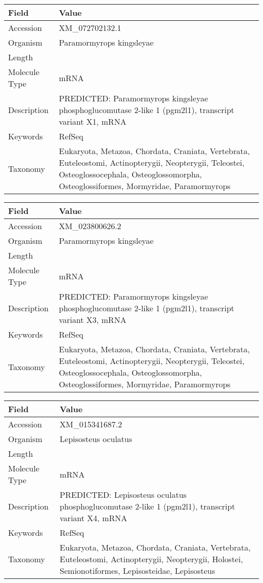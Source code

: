 \documentclass[10pt]{article}
\begin{document}
{\footnotesize
\begin{longtable}{>{\raggedright\arraybackslash}p{4.5cm} >{\raggedright\arraybackslash}p{11.5cm}}
\textbf{Field} & \textbf{Value} \\
\hline
Accession & XM\_072702132.1 \\
Organism & Paramormyrops kingsleyae \\
Length & 6039 \\
Molecule Type & mRNA \\
Description & PREDICTED: Paramormyrops kingsleyae phosphoglucomutase 2-like 1 (pgm2l1), transcript variant X1, mRNA \\
Keywords & RefSeq \\
Taxonomy & Eukaryota, Metazoa, Chordata, Craniata, Vertebrata, Euteleostomi, Actinopterygii, Neopterygii, Teleostei, Osteoglossocephala, Osteoglossomorpha, Osteoglossiformes, Mormyridae, Paramormyrops \\
\end{longtable}
}

{\footnotesize
\begin{longtable}{>{\raggedright\arraybackslash}p{4.5cm} >{\raggedright\arraybackslash}p{11.5cm}}
\textbf{Field} & \textbf{Value} \\
\hline
Accession & XM\_023800626.2 \\
Organism & Paramormyrops kingsleyae \\
Length & 5961 \\
Molecule Type & mRNA \\
Description & PREDICTED: Paramormyrops kingsleyae phosphoglucomutase 2-like 1 (pgm2l1), transcript variant X3, mRNA \\
Keywords & RefSeq \\
Taxonomy & Eukaryota, Metazoa, Chordata, Craniata, Vertebrata, Euteleostomi, Actinopterygii, Neopterygii, Teleostei, Osteoglossocephala, Osteoglossomorpha, Osteoglossiformes, Mormyridae, Paramormyrops \\
\end{longtable}
}

{\footnotesize
\begin{longtable}{>{\raggedright\arraybackslash}p{4.5cm} >{\raggedright\arraybackslash}p{11.5cm}}
\textbf{Field} & \textbf{Value} \\
\hline
Accession & XM\_015341687.2 \\
Organism & Lepisosteus oculatus \\
Length & 7084 \\
Molecule Type & mRNA \\
Description & PREDICTED: Lepisosteus oculatus phosphoglucomutase 2-like 1 (pgm2l1), transcript variant X4, mRNA \\
Keywords & RefSeq \\
Taxonomy & Eukaryota, Metazoa, Chordata, Craniata, Vertebrata, Euteleostomi, Actinopterygii, Neopterygii, Holostei, Semionotiformes, Lepisosteidae, Lepisosteus \\
\end{longtable}
}
\end{document}
